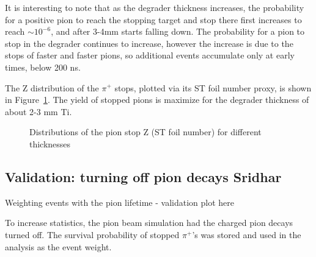 It is interesting to note that as the degrader thickness increases, the probability for a positive pion
to reach the stopping target and stop there first increases to reach $\sim 10^{-6}$, and after 3-4mm
starts falling down.  The probability for a pion to stop in the degrader continues to increase,
however the increase is due to the stops of faster and faster pions, so additional events accumulate
only at early times, below 200 ns.

The Z distribution of the $\pi^+$ stops, plotted via its ST foil number  proxy, is shown
in Figure~\ref{fig:pion_stop_foil}. The yield of stopped pions is maximize for the degrader
thickness of about 2-3 mm Ti.

\begin{figure}[H]
  \caption{
    \label{fig:pion_stop_foil}
    Distributions of the pion stop Z (ST foil number) for different thicknesses
  }
\end{figure}

\newpage
\subsection {{\red Validation: turning off pion decays  Sridhar}}

Weighting events with the pion lifetime - validation plot here

\begin{figure}[H]
  \caption{
    \label{fig:pion_lifetime}
  }
\end{figure}

To increase statistics, the pion beam simulation had the charged pion decays turned off.
The survival probability of stopped $\pi^+$'s was stored and used in the analysis
as the event weight.

